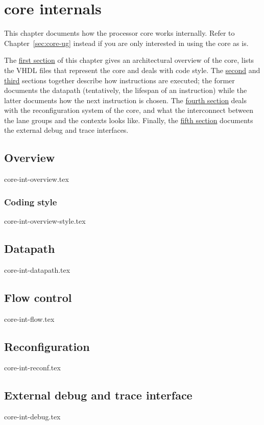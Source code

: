 \chapter{\rvex{} core internals}
\label{sec:core-int}

This chapter documents how the \rvex{} processor core works internally. Refer to
Chapter~\ref{sec:core-ug} instead if you are only interested in using the core
as is.

The \hyperref[sec:core-int-overview]{first section} of this chapter gives an 
architectural overview of the core, lists the VHDL files that represent the 
core and deals with code style. The \hyperref[sec:core-int-datapath]{second} and 
\hyperref[sec:core-int-flow]{third} sections together describe how instructions 
are executed; the former documents the datapath (tentatively, the lifespan of an 
instruction) while the latter documents how the next instruction is chosen. The 
\hyperref[sec:core-int-reconf]{fourth section} deals with the reconfiguration 
system of the core, and what the interconnect between the lane groups and the 
contexts looks like. Finally, the \hyperref[sec:core-int-debug]{fifth section} 
documents the external debug and trace interfaces.

\clearpage
\section{Overview}
\newcommand{\coreoverviewintro}{The last section documents the coding style
employed within all \rvex{} core files.}
{core-int-overview.tex}
\subsection{Coding style}
{core-int-overview-style.tex}

\clearpage
\section{Datapath}
{core-int-datapath.tex}

\clearpage
\section{Flow control}
{core-int-flow.tex}

\clearpage
\section{Reconfiguration}
{core-int-reconf.tex}

\clearpage
\section{External debug and trace interface}
{core-int-debug.tex}
